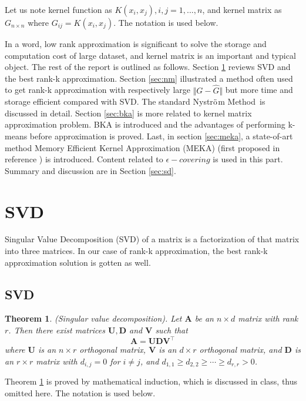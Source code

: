 \documentclass[12pt, a4paper, oneside]{article}
\newtheorem{theorem}{Theorem}
\newcommand{\nysm}{Nystr$\ddot{\rm o}$m Method}
\begin{document}
Let us note kernel function as $K(x_i, x_j), i, j = 1,...,n$, and kernel matrix as $G_{n\times n}$ where $G_{ij} = K(x_i, x_j)$. The notation is used below.

In a word, low rank approximation is significant to solve the storage and computation cost of large dataset, and kernel matrix is an important and typical object. The rest of the report is outlined as follows. Section \ref{sec:svd} reviews SVD and the best rank-k approximation. Section \ref{sec:nm} illustrated a method often used to get rank-k approximation with respectively large $\Vert G - \hat{G} \Vert $ but more time and storage efficient compared with SVD. The standard \nysm\ is discussed in detail. Section \ref{sec:bka} is more related to kernel matrix approximation problem. BKA is introduced and the advantages of performing k-means before approximation is proved. Last, in section \ref{sec:meka}, a state-of-art method Memory Efficient Kernel Approximation (MEKA) (first proposed in reference \cite{meka}) is introduced. Content related to $\epsilon -covering$ is used in this part. Summary and discussion are in Section \ref{sec:sd}.

\section{SVD} %
\label{sec:svd}

Singular Value Decomposition (SVD) of a matrix is a factorization of that matrix into three matrices. In our case of rank-k approximation, the best rank-k approximation solution is gotten as well.

\subsection{SVD}
\label{subsec:ssvd}

\begin{theorem}
	\label{thm:svd}
	(Singular value decomposition). Let $\mathbf{A}$ be an $n \times d$ matrix with rank $r$. Then there exist matrices $\mathbf{U}, \mathbf{D}$ and $\mathbf{V}$ such that
	$$
	\mathbf{A}=\mathbf{U D V}^{\top}
	$$
	where $\mathbf{U}$ is an $n \times r$ orthogonal matrix, $\mathbf{V}$ is an $d \times r$ orthogonal matrix, and $\mathbf{D}$ is an $r \times r$ matrix with $d_{i, j}=0$ for $i \neq j$, and $d_{1,1} \geq d_{2,2} \geq \cdots \geq d_{r, r}>0$.
\end{theorem}

Theorem \ref{thm:svd} is proved by mathematical induction, which is discussed in class, thus omitted here. The notation is used below.
\end{document}
